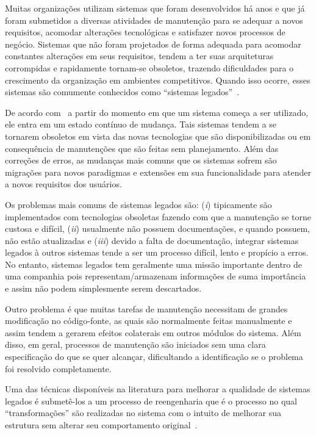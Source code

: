 
Muitas organizações utilizam sistemas que foram desenvolvidos há anos e que já foram submetidos a diversas atividades de manutenção para se adequar a novos requisitos, acomodar alterações tecnológicas e satisfazer novos processos de negócio. Sistemas que não foram projetados de forma adequada para acomodar constantes alterações em seus requisitos, tendem a ter suas arquiteturas corrompidas e rapidamente tornam-se obsoletos, trazendo dificuldades para o crescimento da organização em ambientes competitivos. Quando isso ocorre, esses sistemas são comumente conhecidos como ``sistemas legados''~\cite{Griffith2011}. 

De acordo com~\citet{Fokaefs2012} a partir do momento em que um sistema começa a ser utilizado, ele entra em um estado contínuo de mudança. Tais sistemas tendem a se tornarem obsoletos em vista das novas tecnologias que são disponibilizadas ou em consequência de manutenções que são feitas sem planejamento. Além das correções de erros, as mudanças mais comuns que os sistemas sofrem são migrações para novos paradigmas e extensões em sua funcionalidade para atender a novos requisitos dos usuários. 

Os problemas mais comuns de sistemas legados são: (\textit{i}) tipicamente são implementados com tecnologias obsoletas fazendo com que a manutenção se torne custosa e difícil, (\textit{ii}) usualmente não possuem documentações, e quando possuem, não estão atualizadas e (\textit{iii}) devido a falta de documentação, integrar sistemas legados à outros sistemas tende a ser um processo difícil, lento e propício a erros. No entanto, sistemas legados tem geralmente uma missão importante dentro de uma companhia pois representam/armazenam informações de suma importância e assim não podem simplesmente serem descartados.


Outro problema é que muitas tarefas de manutenção necessitam de grandes modificação no código-fonte, as quais são normalmente feitas manualmente e assim tendem a gerarem efeitos colaterais em outros módulos do sistema. Além disso, em geral, processos de manutenção são iniciados sem uma clara especificação do que se quer alcançar, dificultando a identificação se o problema foi resolvido completamente.



Uma das técnicas disponíveis na literatura para melhorar a qualidade de sistemas legados é submetê-los a um processo de reengenharia que é o processo no qual ``transformações'' são realizadas no sistema com o intuito de melhorar sua estrutura sem alterar seu comportamento original~\cite{refactImpro}.  



